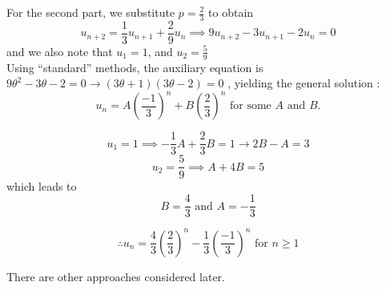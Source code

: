 For the second part, we substitute $p = \frac{2}{3}$ to obtain
\begin{equation*} 
u_{n+2} = \frac{1}{3} u_{n+1} + \frac{2}{9} u_n  \implies 9u_{n+2} - 3u_{n+1} - 2u_n = 0
\end{equation*}
and we also note that $u_1 = 1$, and $u_2 = \frac{5}{9}$ \\

Using ``standard'' methods, the auxiliary equation is $9\theta^2 - 3\theta - 2 = 0 \rightarrow (3\theta+1)(3\theta-2) = 0$ , yielding the general solution : 
\begin{equation*} 
u_n = A\left(\frac{-1}{3}\right)^n + B\left(\frac{2}{3}\right)^n \text{ for some } A \text{ and } B.
\end{equation*} 

\begin{equation*} 
u_1 = 1 \implies -\frac{1}{3}A + \frac{2}{3}B = 1 \rightarrow 2B - A = 3
\end{equation*} 
\begin{equation*} 
u_2 = \frac{5}{9} \implies A + 4B = 5
\end{equation*} 
which leads to 
\begin{equation*} 
B = \frac{4}{3} \text{ and } A = -\frac{1}{3}
\end{equation*} 

\begin{equation} 
\therefore u_n = \frac{4}{3} \left(\frac{2}{3}\right)^n - \frac{1}{3} \left(\frac{-1}{3}\right)^n   \text{ for } n \geq 1
\label{Ex27_Result}
\end{equation} 

There are other approaches considered later.

